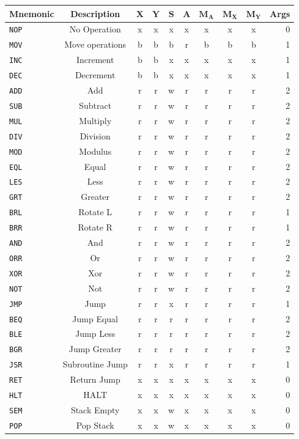 \documentclass{article}
\newcommand{\x}{$\textbf{X}$}
\newcommand{\y}{$\textbf{Y}$}
\newcommand{\s}{$\textbf{S}$}
\newcommand{\A}{$\textbf{A}$}
\newcommand{\mx}{$\textbf{M}_{\textbf{X}}$}
\newcommand{\my}{$\textbf{M}_{\textbf{Y}}$}
\newcommand{\ma}{$\textbf{M}_{\textbf{A}}$}
\newcommand{\V}{\verb}
\begin{document}
\begin{tabular}{l || c | *{7}{c|} | r}
\textbf{Mnemonic} & \textbf{Description} & \x & \y& \s & \A &\ma & \mx & \my &
Args
\\
\hline
\V+NOP+ & No Operation & x & x & x & x & x & x & x & 0  \\
\hline
\V+MOV+ & Move operations & b & b & b & r & b & b & b & 1 \\
\hline
\V+INC+ & Increment& b & b & x & x & x & x & x & 1 \\
\V+DEC+ & Decrement	& b & b & x & x & x & x & x & 1 \\
\V+ADD+ & Add		& r & r & w & r & r & r & r & 2 \\
\V+SUB+ & Subtract	& r & r & w & r & r & r & r & 2 \\
\V+MUL+ & Multiply	& r & r & w & r & r & r & r & 2 \\
\V+DIV+ & Division	& r & r & w & r & r & r & r & 2 \\
\V+MOD+ & Modulus	& r & r & w & r & r & r & r & 2 \\
\hline
\V+EQL+ & Equal		& r & r & w & r & r & r & r & 2 \\
\V+LES+ & Less		& r & r & w & r & r & r & r & 2 \\
\V+GRT+ & Greater 	& r & r & w & r & r & r & r & 2 \\
\V+BRL+ & Rotate L	& r & r & w & r & r & r & r & 1 \\
\V+BRR+ & Rotate R	& r & r & w & r & r & r & r & 1 \\
\V+AND+ & And		& r & r & w & r & r & r & r & 2 \\
\V+ORR+ & Or 		& r & r & w & r & r & r & r & 2 \\
\V+XOR+ & Xor		& r & r & w & r & r & r & r & 2 \\
\V+NOT+ & Not		& r & r & w & r & r & r & r & 2 \\
\hline
\V+JMP+ & Jump		& r & r & x & r & r & r & r & 1 \\
\V+BEQ+ & Jump Equal& r & r & r & r & r & r & r & 2 \\
\V+BLE+ & Jump Less	& r & r & r & r & r & r & r & 2 \\
\V+BGR+ & Jump Greater& r & r & r & r & r & r & r & 2 \\
\V+JSR+ & Subroutine Jump& r & r & x & r & r & r & r & 1 \\
\V+RET+ & Return Jump& x & x & x & x & x & x & x & 0 \\
\hline
\V+HLT+ & HALT& x & x & x & x & x & x & x & 0 \\
\V+SEM+ & Stack Empty& x & x & w & x & x & x & x & 0 \\
\V+POP+ & Pop Stack& x & x & w & x & x & x & x & 0 \\
\end{tabular}
 
\end{document}
